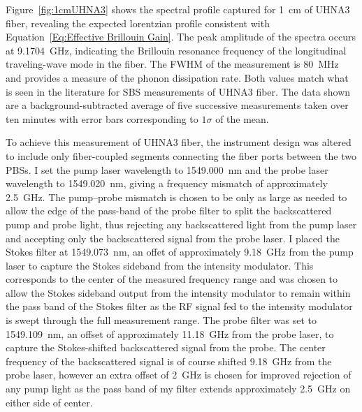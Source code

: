\FloatBarrier

Figure~\ref{fig:1cmUHNA3} shows the spectral profile captured for \SI{1}{\centi\meter} of UHNA3 fiber, revealing the expected lorentzian profile consistent with Equation~\ref{Eq:Effective Brillouin Gain}. The peak amplitude of the spectra occurs at \SI{9.1704}{\giga\hertz}, indicating the Brillouin resonance frequency of the longitudinal traveling-wave mode in the fiber. The FWHM of the measurement is \SI{80}{\mega\hertz} and provides a measure of the phonon dissipation rate. Both values match what is seen in the literature for SBS measurements of UHNA3 fiber.\cite{behunin2015long} The data shown are a background-subtracted average of five successive measurements taken over ten minutes with error bars corresponding to \(1\sigma\) of the mean.

To achieve this measurement of UHNA3 fiber, the instrument design was altered to include only fiber-coupled segments connecting the fiber ports between the two PBSs. I set the pump laser wavelength to \SI{1549.000}{\nano\meter} and the probe laser wavelength to \SI{1549.020}{\nano\meter}, giving a frequency mismatch of approximately \SI{2.5}{\giga\hertz}. The pump--probe mismatch is chosen to be only as large as needed to allow the edge of the pass-band of the probe filter to split the backscattered pump and probe light, thus rejecting any backscattered light from the pump laser and accepting only the backscattered signal from the probe laser. I placed the Stokes filter at \SI{1549.073}{\nano\meter}, an offet of approximately \SI{9.18}{\giga\hertz} from the pump laser to capture the Stokes sideband from the intensity modulator. This corresponds to the center of the measured frequency range and was chosen to allow the Stokes sideband output from the intensity modulator to remain within the pass band of the Stokes filter as the RF signal fed to the intensity modulator is swept through the full measurement range. The probe filter was set to \SI{1549.109}{\nano\meter}, an offset of approximately \SI{11.18}{\giga\hertz} from the probe laser, to capture the Stokes-shifted backscattered signal from the probe. The center frequency of the backscattered signal is of course shifted \SI{9.18}{\giga\hertz} from the probe laser, however an extra offset of \SI{2}{\giga\hertz} is chosen for improved rejection of any pump light as the pass band of my filter extends approximately \SI{2.5}{\giga\hertz} on either side of center.

